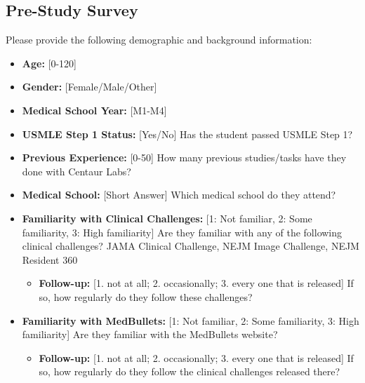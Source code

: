 \documentclass[11pt]{article}
\begin{document}
\subsection{Pre-Study Survey}
\begin{tcolorbox}[palebluebox]
\small
Please provide the following demographic and background information:

\vspace{2mm}

\begin{itemize}
    \item \textbf{Age:} [0-120]
    \item \textbf{Gender:} [Female/Male/Other]
    \item \textbf{Medical School Year:} [M1-M4]
    \item \textbf{USMLE Step 1 Status:} [Yes/No] Has the student passed USMLE Step 1?
    \item \textbf{Previous Experience:} [0-50] How many previous studies/tasks have they done with Centaur Labs?
    \item \textbf{Medical School:} [Short Answer] Which medical school do they attend?
    
    \vspace{2mm}
    
    \item \textbf{Familiarity with Clinical Challenges:} [1: Not familiar, 2: Some familiarity, 3: High familiarity] Are they familiar with any of the following clinical challenges? JAMA Clinical Challenge, NEJM Image Challenge, NEJM Resident 360
    \begin{itemize}
        \item \textbf{Follow-up:} [1. not at all; 2. occasionally; 3. every one that is released] If so, how regularly do they follow these challenges?
    \end{itemize}
    
    \vspace{2mm}
    
    \item \textbf{Familiarity with MedBullets:} [1: Not familiar, 2: Some familiarity, 3: High familiarity] Are they familiar with the MedBullets website?
    \begin{itemize}
        \item \textbf{Follow-up:} [1. not at all; 2. occasionally; 3. every one that is released] If so, how regularly do they follow the clinical challenges released there?
    \end{itemize}
    

\end{itemize}
\end{tcolorbox}
\end{document}
